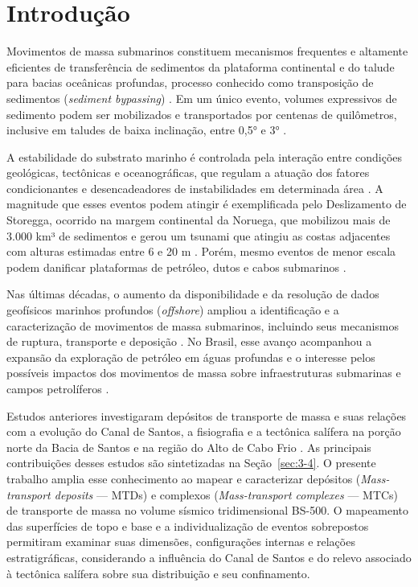 \chapter{Introdução}\label{cap:introducao}

Movimentos de massa submarinos constituem mecanismos frequentes e altamente eficientes de transferência de sedimentos da plataforma continental e do talude para bacias oceânicas profundas, processo conhecido como transposição de sedimentos (\textit{sediment bypassing}) \cite{hampton1996}. Em um único evento, volumes expressivos de sedimento podem ser mobilizados e transportados por centenas de quilômetros, inclusive em taludes de baixa inclinação, entre 0,5° e 3° \cite{hampton1996}.

A estabilidade do substrato marinho é controlada pela interação entre condições geológicas, tectônicas e oceanográficas, que regulam a atuação dos fatores condicionantes e desencadeadores de instabilidades em determinada área \cite{hampton1996}. A magnitude que esses eventos podem atingir é exemplificada pelo Deslizamento de Storegga, ocorrido na margem continental da Noruega, que mobilizou mais de 3.000 km³ de sedimentos e gerou um tsunami que atingiu as costas adjacentes com alturas estimadas entre 6 e 20 m \cite{bondevik2005,bondevik2012}. Porém, mesmo eventos de menor escala podem danificar plataformas de petróleo, dutos e cabos submarinos \cite{tappin2001}.

Nas últimas décadas, o aumento da disponibilidade e da resolução de dados geofísicos marinhos profundos (\textit{offshore}) ampliou a identificação e a caracterização de movimentos de massa submarinos, incluindo seus mecanismos de ruptura, transporte e deposição \cite{bull2009}. No Brasil, esse avanço acompanhou a expansão da exploração de petróleo em águas profundas e o interesse pelos possíveis impactos dos movimentos de massa sobre infraestruturas submarinas e campos petrolíferos \cite{borges2015,kowsmann2015}.

Estudos anteriores investigaram depósitos de transporte de massa e suas relações com a evolução do Canal de Santos, a fisiografia e a tectônica salífera na porção norte da Bacia de Santos e na região do Alto de Cabo Frio \cite{ashabranner2010,dutra2019,dionisio2022,assis2024}. As principais contribuições desses estudos são sintetizadas na Seção~\ref{sec:3-4}. O presente trabalho amplia esse conhecimento ao mapear e caracterizar depósitos (\textit{Mass-transport deposits} — MTDs) e complexos (\textit{Mass-transport complexes} — MTCs) de transporte de massa no volume sísmico tridimensional BS-500. O mapeamento das superfícies de topo e base e a individualização de eventos sobrepostos permitiram examinar suas dimensões, configurações internas e relações estratigráficas, considerando a influência do Canal de Santos e do relevo associado à tectônica salífera sobre sua distribuição e seu confinamento.


